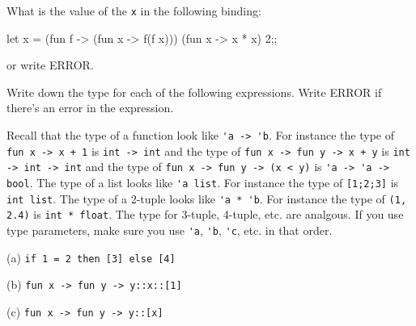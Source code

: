 \ANSWER
\begin{answercode}
  
\end{answercode}

\newpage
\nextq
What is the value of the \verb!x! in the following binding:
\begin{console}
let x = (fun f -> (fun x -> f(f x))) (fun x -> x * x) 2;;
\end{console}
or write ERROR.

\ANSWER
\begin{answercode}

\end{answercode}

\newpage
\nextq
Write down the type for each of the following expressions.
Write ERROR if there's an error in the expression.
\begin{tightlist}
\li Recall that the type of a function look like
\verb!'a -> 'b!.    
For instance the type of \verb!fun x -> x + 1! is
\verb!int -> int! and the type of
\verb!fun x -> fun y -> x + y! is \verb!int -> int -> int!
and the type of
\verb!fun x -> fun y -> (x < y)! is \verb!'a -> 'a -> bool!.
\li The type of a list looks like \verb!'a list!.
For instance the type of \verb![1;2;3]! is
\verb!int list!.
\li The type of a 2-tuple looks like \verb!'a * 'b!.
For instance the type of \verb!(1, 2.4)! is
\verb!int * float!.
The type for 3-tuple, 4-tuple, etc. are analgous.
\li If you use type parameters, make sure you use \verb!'a!,
\verb!'b!, \verb!'c!, etc. in that order.
\end{tightlist}


(a) \verb!if 1 = 2 then [3] else [4]!
\\
\ANSWER
\begin{answercode}

\end{answercode}

(b) \verb!fun x -> fun y -> y::x::[1]!
\\
\ANSWER
\begin{answercode}

\end{answercode}

(c) \verb!fun x -> fun y -> y::[x]!
\\
\ANSWER
\begin{answercode}

\end{answercode}

